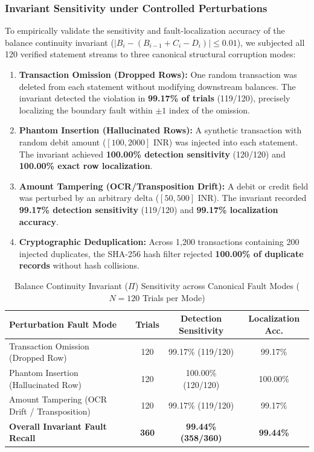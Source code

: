 \documentclass[conference]{IEEEtran}
\begin{document}
\subsubsection{Invariant Sensitivity under Controlled Perturbations}
To empirically validate the sensitivity and fault-localization accuracy of the balance continuity invariant ($|B_i - (B_{i-1} + C_i - D_i)| \le 0.01$), we subjected all 120 verified statement streams to three canonical structural corruption modes:
\begin{enumerate}
    \item \textbf{Transaction Omission (Dropped Rows):} One random transaction was deleted from each statement without modifying downstream balances. The invariant detected the violation in \textbf{99.17\% of trials} (119/120), precisely localizing the boundary fault within $\pm 1$ index of the omission.
    \item \textbf{Phantom Insertion (Hallucinated Rows):} A synthetic transaction with random debit amount ($[100, 2000]$ INR) was injected into each statement. The invariant achieved \textbf{100.00\% detection sensitivity} (120/120) and \textbf{100.00\% exact row localization}.
    \item \textbf{Amount Tampering (OCR/Transposition Drift):} A debit or credit field was perturbed by an arbitrary delta ($[50, 500]$ INR). The invariant recorded \textbf{99.17\% detection sensitivity} (119/120) and \textbf{99.17\% localization accuracy}.
    \item \textbf{Cryptographic Deduplication:} Across 1,200 transactions containing 200 injected duplicates, the SHA-256 hash filter rejected \textbf{100.00\% of duplicate records} without hash collisions.
\end{enumerate}

\begin{table}[t]
\caption{Balance Continuity Invariant ($\Pi$) Sensitivity across Canonical Fault Modes ($N=120$ Trials per Mode)}
\label{tab:perturbation_bench}
\centering
\begin{tabular}{lccc}
\toprule
\textbf{Perturbation Fault Mode} & \textbf{Trials} & \textbf{Detection Sensitivity} & \textbf{Localization Acc.} \\
\midrule
Transaction Omission (Dropped Row)    & 120 & 99.17\% (119/120) & 99.17\% \\
Phantom Insertion (Hallucinated Row)  & 120 & 100.00\% (120/120) & 100.00\% \\
Amount Tampering (OCR Drift / Transposition) & 120 & 99.17\% (119/120) & 99.17\% \\
\midrule
\textbf{Overall Invariant Fault Recall} & \textbf{360} & \textbf{99.44\% (358/360)} & \textbf{99.44\%} \\
\bottomrule
\end{tabular}
\end{table}
\end{document}
